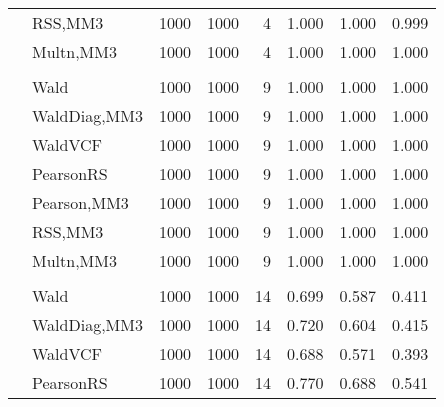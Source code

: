 \documentclass[
]{article}
\begin{document}
\begin{table}[H]
{\begin{tabular}[t]{llrrrrrr}
\hspace{1em} & RSS,MM3 & 1000 & 1000 & 4 & 1.000 & 1.000 & 0.999\\

\hspace{1em} & Multn,MM3 & 1000 & 1000 & 4 & 1.000 & 1.000 & 1.000\\
\cmidrule{1-8}
\addlinespace[0.3em]
\multicolumn{8}{l}{\textbf{1F 15V}}\\
\hspace{1em} & Wald & 1000 & 1000 & 9 & 1.000 & 1.000 & 1.000\\

\hspace{1em} & WaldDiag,MM3 & 1000 & 1000 & 9 & 1.000 & 1.000 & 1.000\\

\hspace{1em} & WaldVCF & 1000 & 1000 & 9 & 1.000 & 1.000 & 1.000\\

\hspace{1em} & PearsonRS & 1000 & 1000 & 9 & 1.000 & 1.000 & 1.000\\

\hspace{1em} & Pearson,MM3 & 1000 & 1000 & 9 & 1.000 & 1.000 & 1.000\\

\hspace{1em} & RSS,MM3 & 1000 & 1000 & 9 & 1.000 & 1.000 & 1.000\\

\hspace{1em} & Multn,MM3 & 1000 & 1000 & 9 & 1.000 & 1.000 & 1.000\\
\cmidrule{1-8}
\addlinespace[0.3em]
\multicolumn{8}{l}{\textbf{2F 10V}}\\
\hspace{1em} & Wald & 1000 & 1000 & 14 & 0.699 & 0.587 & 0.411\\

\hspace{1em} & WaldDiag,MM3 & 1000 & 1000 & 14 & 0.720 & 0.604 & 0.415\\

\hspace{1em} & WaldVCF & 1000 & 1000 & 14 & 0.688 & 0.571 & 0.393\\

\hspace{1em} & PearsonRS & 1000 & 1000 & 14 & 0.770 & 0.688 & 0.541\\


\end{tabular}}
\end{table}
\end{document}
